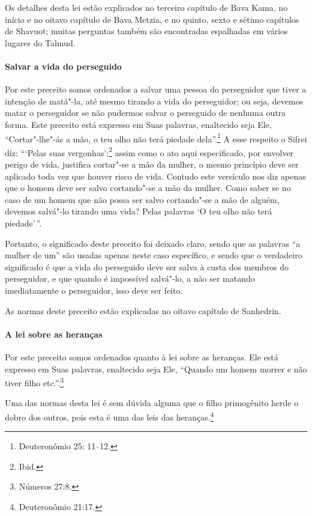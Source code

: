 \begin{multicols}{2}
Os detalhes desta lei estão explicados no terceiro capítulo de Bava
Kama\starr, no início e no oitavo capítulo de Bava Metzia\starr, e no quinto, sexto
e sétimo capítulos de Shavuot\starr; muitas perguntas também são encontradas
espalhadas em vários lugares do Talmud\starr.

\paragraph{Salvar a vida do perseguido}

Por este preceito somos ordenados a salvar uma pessoa do perseguidor
que tiver a intenção de matá"-la, até mesmo tirando a vida do
perseguidor; ou seja, devemos matar o perseguidor se não pudermos salvar
o perseguido de nenhuma outra forma. Este preceito está expresso em Suas
palavras, enaltecido seja Ele, ``Cortar"-lhe"-ás a mão, o teu olho não
terá piedade dela''.\footnote{Deuteronômio 25: 11--12.} A esse respeito o Sifrei\starr{}
diz: ```Pelas suas vergonhas':\footnote{Ibid.} assim como o ato aqui
especificado, por envolver perigo de vida, justifica cortar"-se a mão da
mulher, o mesmo princípio deve ser aplicado toda vez que houver risco de
vida. Contudo este versículo nos diz apenas que o homem deve ser salvo
cortando"-se a mão da mulher. Como saber se no caso de um homem que não
possa ser salvo cortando"-se a mão de alguém, devemos salvá"-lo tirando
uma vida? Pelas palavras `O teu olho não terá piedade'\,''.

Portanto, o significado deste preceito foi deixado claro, sendo que as
palavras ``a mulher de um'' são usadas apenas neste caso específico, e
sendo que o verdadeiro significado é que a vida do perseguido deve ser
salva à custa dos membros do perseguidor, e que quando é impossível salvá"-lo, a não
ser matando imediatamente o perseguidor, isso deve ser feito.

As normas deste preceito estão explicadas no oitavo capítulo de Sanhedrin\starr.

\paragraph{A lei sobre as heranças}

Por este preceito somos ordenados quanto à lei sobre as heranças. Ele
está expresso em Suas palavras, enaltecido seja Ele, ``Quando um homem
morrer e não tiver filho etc.''.\footnote{Números 27:8.}

Uma das normas desta lei é sem dúvida alguma que o filho primogênito
herde o dobro dos outros, pois esta é uma das leis das
heranças.\footnote{Deuteronômio 21:17.}


\end{multicols}
